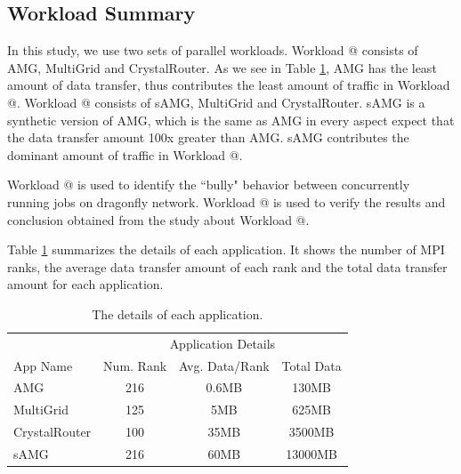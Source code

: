 \documentclass[conference,compsoc]{IEEEtran}
\makeatletter
\newcommand{\Rmnum}[1]{\expandafter\@slowromancap\romannumeral #1@}
\makeatother
\begin{document}
\subsection{Workload Summary}
\label{sec:workload summary}





In this study, we use two sets of parallel workloads. Workload \Rmnum{1} consists of AMG, MultiGrid and CrystalRouter. As we see in Table \ref{tab:apps-detail}, AMG has the least amount of data transfer, thus contributes the least amount of traffic in Workload \Rmnum{1}. Workload \Rmnum{2} consists of sAMG, MultiGrid and CrystalRouter. sAMG is a synthetic version of AMG, which is the same as AMG in every aspect expect that the data transfer amount 100x greater than AMG. sAMG contributes the dominant amount of traffic in Workload \Rmnum{2}. 

Workload \Rmnum{1} is used to identify the ``bully" behavior between concurrently running jobs on dragonfly network. Workload \Rmnum{2} is used to verify the results and conclusion obtained from the study about Workload \Rmnum{1}.

Table \ref{tab:apps-detail} summarizes the details of each application. It shows the number of MPI ranks, the average data transfer amount of each rank and the total data transfer amount for each application.

\begin{table}[ht]
\begin{center}
\caption{The details of each application.} 
\label{tab:apps-detail}
\begin{tabular}{l c c c }
\toprule %
\toprule
&\multicolumn{3}{c}{Application Details} \\ %
\cmidrule(l){2-4}
App Name & Num. Rank & Avg. Data/Rank & Total Data\\ %
\midrule %
AMG  &    216 &   0.6MB   &     130MB\\ %
\midrule
MultiGrid  &    125 &   5MB   &     625MB\\ 
\midrule
CrystalRouter  &   100  &  35MB    &     3500MB\\ 
\midrule
sAMG  &    216 &   60MB   &     13000MB\\ %
\midrule %
\bottomrule %
\end{tabular}
\end{center}
\end{table}
\end{document}
